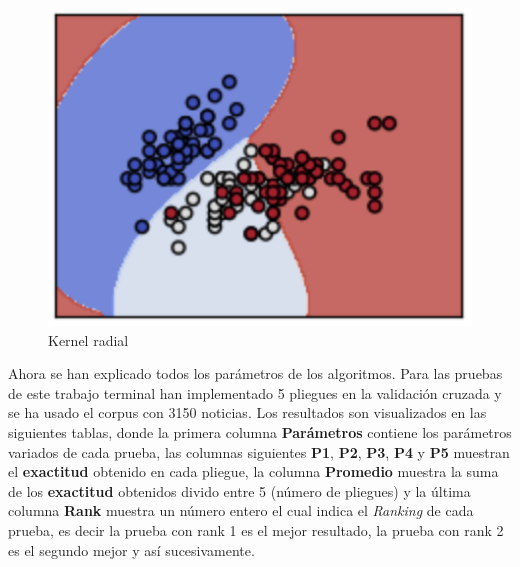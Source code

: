 \begin{figure}[H]
\centering
\includegraphics[scale=0.8]{imagenes/capitulo5/Entrenamiento/krbf.png}
\caption{Kernel radial}
\label{fig:cp5:krbf}
\end{figure}


Ahora se han explicado todos los parámetros de los algoritmos. Para las pruebas de este trabajo terminal han implementado 5 pliegues en la validación cruzada y se ha usado el corpus con 3150 noticias. Los resultados son visualizados en las siguientes tablas, donde la primera columna \textbf{Parámetros} contiene los parámetros variados de cada prueba, las columnas siguientes \textbf{P1}, \textbf{P2}, \textbf{P3}, \textbf{P4} y \textbf{P5} muestran el \textbf{exactitud} obtenido en cada pliegue, la columna \textbf{Promedio} muestra la suma de los \textbf{exactitud} obtenidos divido entre 5 (número de pliegues) y la última columna \textbf{Rank} muestra un número entero el cual indica el \textit{Ranking} de cada prueba, es decir la prueba con rank 1 es el mejor resultado, la prueba con rank 2 es el segundo mejor y así sucesivamente.\\

